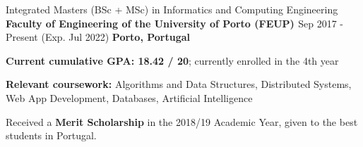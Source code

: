 

\begin{cventries}

  \cventry
    {Integrated Masters (BSc + MSc) in Informatics and Computing Engineering} %
    {\textbf{Faculty of Engineering of the University of Porto (FEUP) \href{https://sigarra.up.pt/feup/en/web_page.inicial}{\faExternalLink}}} %
    {Sep 2017 - Present (Exp. Jul 2022)} %
    {\textbf{Porto, Portugal}} %
    {
      \begin{cvitems} %
        \item {\textbf{Current cumulative GPA: 18.42 / 20}; currently enrolled in the 4th year}
        \item {\textbf{Relevant coursework:} Algorithms and Data Structures, Distributed Systems, Web App Development, Databases, Artificial Intelligence}
        \item {Received a \textbf{Merit Scholarship} in the 2018/19 Academic Year, given to the best students in Portugal.}
      \end{cvitems}
    }

\end{cventries}

